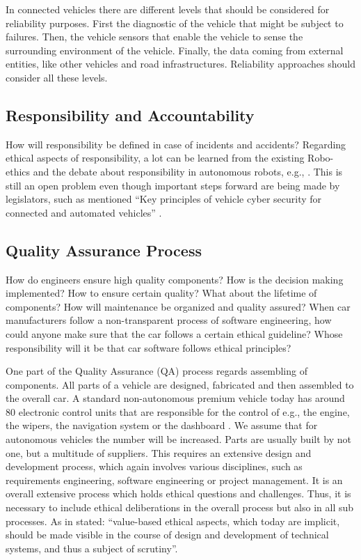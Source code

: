 In connected vehicles there are different levels that should be considered for reliability purposes. First the diagnostic of the vehicle that might be subject to failures. Then, the vehicle sensors that enable the vehicle to sense the surrounding environment of the vehicle. Finally, the data coming from external entities, like other vehicles and road infrastructures. Reliability approaches should consider all these levels.


\subsection{Responsibility and Accountability}
\label{sec:EAofTC:ResponsibilityAndAccountability}

How will responsibility be defined in case of incidents and accidents? Regarding ethical aspects of responsibility, a lot can be learned from the existing Robo-ethics and the debate about responsibility in autonomous robots, e.g., \cite{Dodig-Crnkovic:2008:SMR:1566864.1566888}. This is still an open problem even though important steps forward are being made by legislators, such as mentioned \enquote{Key principles of vehicle cyber security for connected and automated vehicles} \cite{DepartmentforTransportDfT2017}.


\subsection{Quality Assurance Process}
\label{sec:EAofTC:QualityAssuranceProcess}

How do engineers ensure high quality components? How is the decision making implemented? How to ensure certain quality? What about the lifetime of components? How will maintenance be organized and quality assured?
When car manufacturers follow a non-transparent process of software engineering, how could anyone make sure that the car follows a certain ethical guideline? Whose responsibility will it be that car software follows ethical principles?

One part of the Quality Assurance (QA) process regards assembling of components. All parts of a vehicle are designed, fabricated and then assembled to the overall car. A standard non-autonomous premium vehicle today has around 80 electronic control units that are responsible for the control of e.g., the engine, the wipers, the navigation system or the dashboard \cite{BoschGmbH2013}. We assume that for autonomous vehicles the number will be increased. Parts are usually built by not one, but a multitude of suppliers. This requires an extensive design and development process, which again involves various disciplines, such as requirements engineering, software engineering or project management. It is an overall extensive process which holds ethical questions and challenges. Thus, it is necessary to include ethical deliberations in the overall process but also in all sub processes. As in \cite{Sapienza2016a} stated: \enquote{value-based ethical aspects, which today are implicit, should be made visible in the course of design and development of technical systems, and thus a subject of scrutiny}. 

